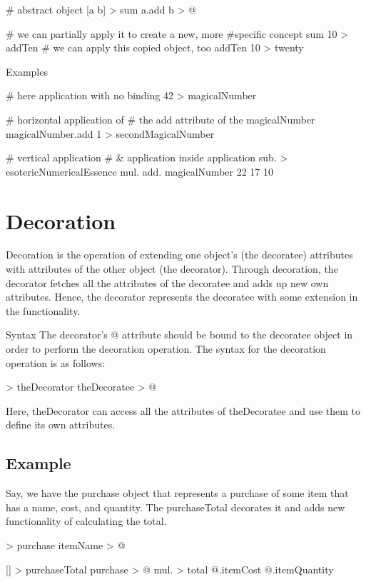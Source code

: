 \documentclass[12pt]{book}
\begin{document}
\begin{ffcode}
# abstract object
[a b] > sum
  a.add b > @

# we can partially apply it to create a new, more
#specific concept
sum 10 > addTen
# we can apply this copied object, too
addTen 10 > twenty
\end{ffcode}

Examples
\begin{ffcode}
# here application with no binding
42 > magicalNumber

# horizontal application of 
# the add attribute of the magicalNumber
magicalNumber.add 1 > secondMagicalNumber

# vertical application
# & application inside application
sub. > esotericNumericalEssence
  mul.
    add.
      magicalNumber
      22
    17
  10
\end{ffcode}

\section{Decoration}
Decoration is the operation of extending one object's (the decoratee) attributes with attributes of the other object (the decorator). Through decoration, the decorator fetches all the attributes of the decoratee and adds up new own attributes. Hence, the decorator represents the decoratee with some extension in the functionality.

Syntax
The decorator's @ attribute should be bound to the decoratee object in order to perform the decoration operation.
The syntax for the decoration operation is as follows:

\begin{ffcode}
[] > theDecorator
  theDecoratee > @
\end{ffcode}
Here, theDecorator can access all the attributes of theDecoratee and use them to define its own attributes.

\subsection{Example}
Say, we have the purchase object that represents a purchase of some item that has a name, cost, and quantity. The purchaseTotal decorates it and adds new functionality of calculating the total.

\begin{ffcode}
 > purchase
  itemName > @

[] > purchaseTotal
  purchase > @
  mul. > total
    @.itemCost
    @.itemQuantity
\end{ffcode}
\end{document}
